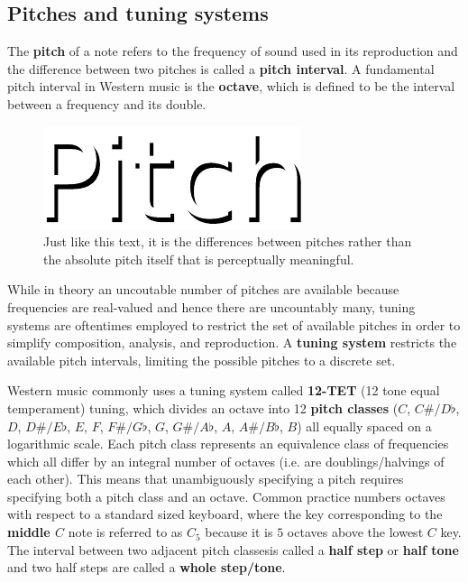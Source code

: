 \subsection{Pitches and tuning systems}

The \textbf{pitch} of a note refers to the frequency of sound used in its
reproduction and the difference between two pitches is called a \textbf{pitch
interval}. A fundamental pitch interval in Western music is the
\textbf{octave}, which is defined to be the interval between a frequency and
its double.

\begin{figure}[htpb]
    \centering
    \includegraphics[width=1.0\linewidth]{Figures/pitch.pdf}
    \caption{Just like this text, it is the differences between pitches
        rather than the absolute pitch itself that is perceptually
    meaningful.}
    \label{fig:pitch}
\end{figure}

While in theory an uncoutable number of pitches are available because
frequencies are real-valued and hence there are uncountably many, tuning
systems are oftentimes employed to restrict the set of available pitches in
order to simplify composition, analysis, and reproduction. A \textbf{tuning
system} restricts the available pitch intervals, limiting the possible pitches
to a discrete set.

Western music commonly uses a tuning system called \textbf{12-TET} (12 tone
equal temperament) tuning, which divides an octave into 12 \textbf{pitch
classes} ($C$, $C\#/D\flat$, $D$, $D\#/E\flat$, $E$, $F$, $F\#/G\flat$, $G$,
$G\#/A\flat$, $A$, $A\#/B\flat$, $B$) all equally spaced on a logarithmic
scale. Each pitch class represents an equivalence class of frequencies which
all differ by an integral number of octaves (i.e. are doublings/halvings of
each other). This means that unambiguously specifying a pitch requires
specifying both a pitch class and an octave. Common practice numbers octaves
with respect to a standard sized keyboard, where the key corresponding to the
\textbf{middle $C$} note is referred to as $C_5$ because it is $5$ octaves
above the lowest $C$ key. The interval between two adjacent pitch classesis
called a \textbf{half step} or \textbf{half tone} and two half steps are called
a \textbf{whole step/tone}.

